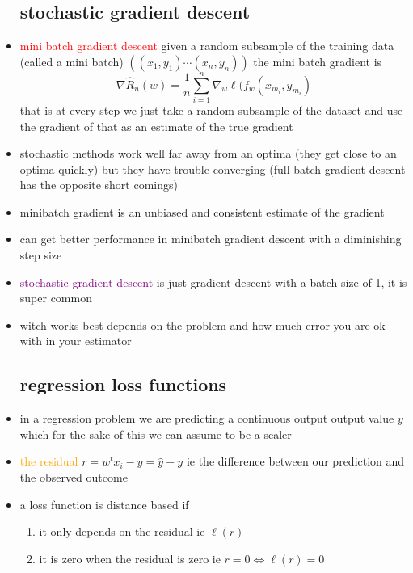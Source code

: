 \documentclass{article}
\begin{document}
\begin{itemize}
\subsection*{stochastic gradient descent}
\item \textcolor{red}{mini batch gradient descent} given a random subsample of the training data (called a mini batch) $((x_1,y_1)\cdots (x_n,y_n))$ the mini batch gradient is $$\nabla \hat{R}_{n}(w)=\frac{1}{n}\sum_{i=1}^{n}\nabla_{w}\ell(f_w(x_{m_i}, y_{m_i})$$
that is at every step we just take a random subsample of the dataset and use the gradient of that as an estimate of the true gradient
\item stochastic methods work well far away from an optima (they get close to an optima quickly) but they have trouble converging (full batch gradient descent has the opposite short comings)
\item minibatch gradient is an unbiased and consistent estimate of the gradient
\item can get better performance in minibatch gradient descent with a diminishing step size 
\item \textcolor{purple}{stochastic gradient descent} is just gradient descent with a batch size of 1, it is super common 
\item witch works best depends on the problem and how much error you are ok with in your estimator  
\subsection*{regression loss functions}
\item in a regression problem we are predicting a continuous output output value $y$ which for the sake of this we can assume to be a scaler
\item \textcolor{orange}{the residual} $r=w^tx_i-y=\hat{y}-y$ ie the difference between our prediction and the observed outcome 
\item a loss function is distance based if 
\begin{enumerate}
    \item it only depends on the residual ie $\ell(r)$
    \item it is zero when the residual is zero ie $r=0\iff \ell(r)=0$
 

\end{enumerate}
\end{itemize}
\end{document}
